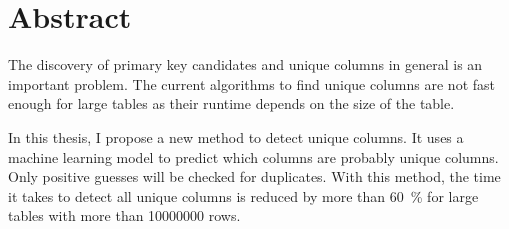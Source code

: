 \begingroup
\let\clearpage\relax
\let\cleardoublepage\relax
\let\cleardoublepage\relax
\chapter*{Abstract}
The discovery of primary key candidates and unique columns in general is an important problem. %
The current algorithms to find unique columns are not fast enough for large tables as their runtime depends on the size of the table.

In this thesis, I propose a new method to detect unique columns. It uses a machine learning model to predict which columns are probably unique columns. Only positive guesses will be checked for duplicates. With this method, the time it takes to detect all unique columns is reduced by more than \SI{60}{\percent} for large tables with more than \num{10000000} rows. %

\endgroup

